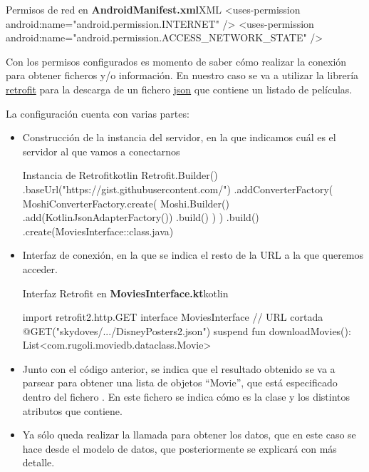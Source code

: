 \documentclass{\ClassPath/viu-tfm-template}
\begin{document}
\begin{mycode}{Permisos de red en \textbf{AndroidManifest.xml}}{XML}{{\small }}
<uses-permission android:name="android.permission.INTERNET" />
<uses-permission android:name="android.permission.ACCESS_NETWORK_STATE" />
\end{mycode}

Con los permisos configurados es momento de saber cómo realizar la conexión para obtener ficheros y/o información. En nuestro caso se va a utilizar la librería \href{https://github.com/square/retrofit}{retrofit} para la descarga de un fichero \href{https://gist.githubusercontent.com/skydoves/176c209dbce4a53c0ff9589e07255f30/raw/6489d9712702e093c4df71500fb822f0d408ef75/DisneyPosters2.json}{json} que contiene un listado de películas.

La configuración cuenta con varias partes:
\begin{itemize}
    \item Construcción de la instancia del servidor, en la que indicamos cuál es el servidor al que vamos a conectarnos
    \begin{mycode}{Instancia de Retrofit}{kotlin}{}
Retrofit.Builder()
    .baseUrl("https://gist.githubusercontent.com/")
    .addConverterFactory(
        MoshiConverterFactory.create(
            Moshi.Builder()
              .add(KotlinJsonAdapterFactory())
              .build()
        )
    )
    .build()
    .create(MoviesInterface::class.java)
    \end{mycode}

    \item Interfaz de conexión, en la que se indica el resto de la URL a la que queremos acceder.
    \begin{mycode}{Interfaz Retrofit en \textbf{MoviesInterface.kt}}{kotlin}{}

import retrofit2.http.GET
interface MoviesInterface {
    // URL cortada
    @GET("skydoves/.../DisneyPosters2.json")
    suspend fun downloadMovies():
        List<com.rugoli.moviedb.dataclass.Movie>
}
\end{mycode}

    \item Junto con el código anterior, se indica que el resultado obtenido se va a parsear para obtener una lista de objetos “Movie”, que está especificado dentro del fichero . En este fichero se indica cómo es la clase y los distintos atributos que contiene.

    \item Ya sólo queda realizar la llamada para obtener los datos, que en este caso se hace desde el modelo de datos, que posteriormente se explicará con más detalle.
\end{itemize}
\end{document}
